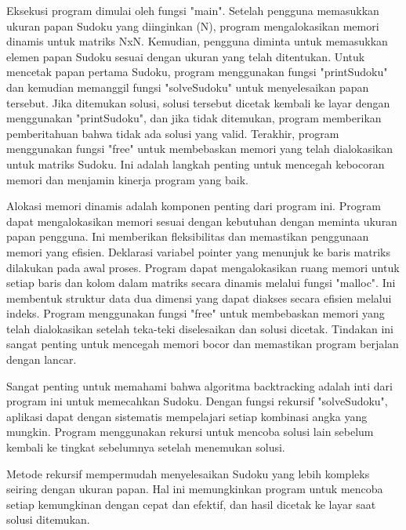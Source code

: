 \documentclass{article}
\begin{document}
\par{Eksekusi program dimulai oleh fungsi "main". Setelah pengguna memasukkan ukuran papan Sudoku yang diinginkan (N), program mengalokasikan memori dinamis untuk matriks NxN. Kemudian, pengguna diminta untuk memasukkan elemen papan Sudoku sesuai dengan ukuran yang telah ditentukan. Untuk mencetak papan pertama Sudoku, program menggunakan fungsi "printSudoku" dan kemudian memanggil fungsi "solveSudoku" untuk menyelesaikan papan tersebut. Jika ditemukan solusi, solusi tersebut dicetak kembali ke layar dengan menggunakan "printSudoku", dan jika tidak ditemukan, program memberikan pemberitahuan bahwa tidak ada solusi yang valid. Terakhir, program menggunakan fungsi "free" untuk membebaskan memori yang telah dialokasikan untuk matriks Sudoku. Ini adalah langkah penting untuk mencegah kebocoran memori dan menjamin kinerja program yang baik.}
\par\null\par
\par{Alokasi memori dinamis adalah komponen penting dari program ini. Program dapat mengalokasikan memori sesuai dengan kebutuhan dengan meminta ukuran papan pengguna. Ini memberikan fleksibilitas dan memastikan penggunaan memori yang efisien. Deklarasi variabel pointer yang menunjuk ke baris matriks dilakukan pada awal proses. Program dapat mengalokasikan ruang memori untuk setiap baris dan kolom dalam matriks secara dinamis melalui fungsi "malloc". Ini membentuk struktur data dua dimensi yang dapat diakses secara efisien melalui indeks. Program menggunakan fungsi "free" untuk membebaskan memori yang telah dialokasikan setelah teka-teki diselesaikan dan solusi dicetak. Tindakan ini sangat penting untuk mencegah memori bocor dan memastikan program berjalan dengan lancar.}
\par\null\par
\par{Sangat penting untuk memahami bahwa algoritma backtracking adalah inti dari program ini untuk memecahkan Sudoku. Dengan fungsi rekursif "solveSudoku", aplikasi dapat dengan sistematis mempelajari setiap kombinasi angka yang mungkin. Program menggunakan rekursi untuk mencoba solusi lain sebelum kembali ke tingkat sebelumnya setelah menemukan solusi.}
\par\null\par
\par{Metode rekursif mempermudah menyelesaikan Sudoku yang lebih kompleks seiring dengan ukuran papan. Hal ini memungkinkan program untuk mencoba setiap kemungkinan dengan cepat dan efektif, dan hasil dicetak ke layar saat solusi ditemukan.}
\end{document}
